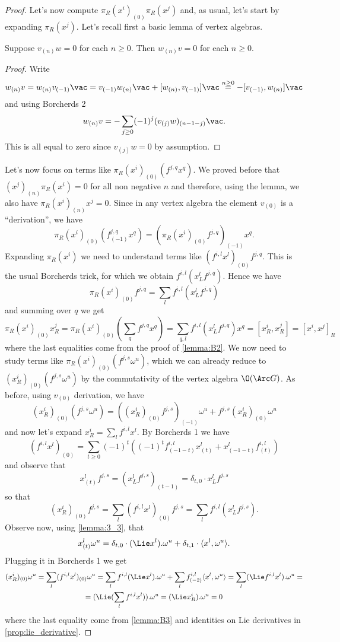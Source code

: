 \documentclass[a4paper, 10pt]{article}
\begin{document}
\begin{proof}
                Let's now compute $\pi_R(x^i)_{(0)}\pi_R(x^j)$ and, as usual, let's start by expanding $\pi_R(x^j)$. Let's recall first a basic lemma of vertex algebras.
                \begin{lemma}
                    Suppose $v_{(n)}w = 0$ for each $n \geq 0$. Then $w_{(n)}v = 0$ for each $n \geq 0$.
                \end{lemma}
                \begin{proof}
                    Write \[w_{(n)}v = w_{(n)}v_{(-1)}\vac = v_{(-1)}w_{(n)}\vac + [w_{(n)}, v_{(-1)}]\vac \stackrel{n \geq 0}{=} -[v_{(-1)}, w_{(n)}]\vac\] and using Borcherds 2 \[w_{(n)}v = -\sum_{j \geq 0} (-1)^j(v_{(j)}w)_{(n-1-j)}\vac. \] This is all equal to zero since $v_{(j)}w = 0$ by assumption. 
                \end{proof}
                Let's now focus on terms like $\pi_R(x^i)_{(0)}(f^{j,q}x^q)$. We proved before that $(x^j)_{(n)}\pi_R(x^i) = 0$ for all non negative $n$ and therefore, using the lemma, we also have $\pi_R(x^i)_{(n)}x^j = 0$. Since in any vertex algebra the element $v_{(0)}$ is a ``derivation'', we have \[\pi_R(x^i)_{(0)}(f^{j,q}_{(-1)}x^q) = (\pi_R(x^i)_{(0)}f^ {j,q})_{(-1)}x^q.  \] Expanding $\pi_R(x^i)$ we need to understand terms like $(f^{i,l}x^l)_{(0)}f^{j,q}$. This is the usual Borcherds trick, for which we obtain $f^{i,l}(x^l_Lf^{j,q})$.
                Hence we have \[\pi_R(x^i)_{(0)}f^{j,q} = \sum_l f^{i,l}(x^l_Lf^{j,q}) \] and summing over $q$ we get \[\pi_R(x^i)_{(0)}x^j_R = \pi_R(x^i)_{(0)}\left(\sum_q f^{j,q}x^q\right) = \sum_{q,l} f^{i,l}(x^l_Lf^{j,q})x^q = [x^i_R, x^j_R] = [x^i, x^j]_R   \] where the last equalities come from the proof of \cref{lemma:B2}.
                We now need to study terms like $\pi_R(x^i)_{(0)}(f^{j,s}\omega^u)$, which we can already reduce to $(x^i_R)_{(0)}(f^{j,s}\omega^u)$ by the commutativity of the vertex algebra $\O(\Arc G)$. As before, using $v_{(0)}$ derivation, we have \[(x^i_R)_{(0)}(f^{j,s}\omega^u) = ((x^i_R)_{(0)}f^{j,s})_{(-1)}\omega^u + f^{j,s}(x^i_R)_{(0)}\omega^u  \] and now let's expand $x^i_R = \sum_l f^{i,l}x^l$. By Borcherds 1 we have \[(f^{i,l}x^l)_{(0)} = \sum_{t \geq 0} (-1)^t\left((-1)^tf^{i,l}_{(-1-t)}x^l_{(t)} + x^l_{(-1-t)}f^{i,l}_{(t)} \right) \] and observe that \[x^l_{(t)}f^{j,s} = (x^l_Lf^{j,s})_{(t-1)} = \delta_{t, 0} \cdot x^l_Lf^{j,s} \] so that \[(x^i_R)_{(0)}f^{j,s} = \sum_l (f^{i,l}x^l)_{(0)}f^{j,s} = \sum_l f^{i,l}(x^l_Lf^{j,s}). \] Observe now, using \cref{lemma:3_3}, that \[x^l_{(t)}\omega^u = \delta_{t, 0} \cdot (\Lie x^l).\omega^u + \delta_{t, 1} \cdot \langle x^l, \omega^u \rangle.  \] Plugging it in Borcherds 1 we get 
                \begin{gather*}
                    (x^i_R)_{(0)}\omega^u = \sum_l (f^{i, l}x^l)_{(0)}\omega^u = \sum_l f^{i,l}(\Lie x^l).\omega^u + \sum_l f^{i,l}_{(-2)}\langle x^l, \omega^u \rangle = \sum_l (\Lie f^{i,l}x^l).\omega^u = \\
                    = (\Lie(\sum_l f^{i,l}x^l)).\omega^u = (\Lie x^i_R).\omega^u = 0 
                \end{gather*}
                where the last equality come from \cref{lemma:B3} and identities on Lie derivatives in \cref{prop:lie_derivative}.


\end{proof}
\end{document}
